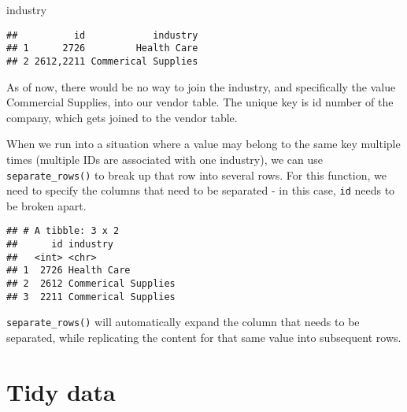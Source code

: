 \documentclass[
]{book}
\newenvironment{Shaded}{\begin{snugshade}}{\end{snugshade}}
\newcommand{\CommentTok}[1]{\textcolor[rgb]{0.56,0.35,0.01}{\textit{#1}}}
\newcommand{\DataTypeTok}[1]{\textcolor[rgb]{0.13,0.29,0.53}{#1}}
\newcommand{\KeywordTok}[1]{\textcolor[rgb]{0.13,0.29,0.53}{\textbf{#1}}}
\newcommand{\NormalTok}[1]{#1}
\newcommand{\OperatorTok}[1]{\textcolor[rgb]{0.81,0.36,0.00}{\textbf{#1}}}
\newcommand{\OtherTok}[1]{\textcolor[rgb]{0.56,0.35,0.01}{#1}}
\newcommand{\StringTok}[1]{\textcolor[rgb]{0.31,0.60,0.02}{#1}}
\begin{document}
\begin{Shaded}
\begin{Highlighting}[]
\NormalTok{industry}
\end{Highlighting}
\end{Shaded}

\begin{verbatim}
##          id            industry
## 1      2726         Health Care
## 2 2612,2211 Commerical Supplies
\end{verbatim}

As of now, there would be no way to join the industry, and specifically the value Commercial Supplies, into our vendor table. The unique key is id number of the company, which gets joined to the vendor table.

When we run into a situation where a value may belong to the same key multiple times (multiple IDs are associated with one industry), we can use \texttt{separate\_rows()} to break up that row into several rows. For this function, we need to specify the columns that need to be separated - in this case, \texttt{id} needs to be broken apart.

\begin{Shaded}
\end{Shaded}

\begin{verbatim}
## # A tibble: 3 x 2
##      id industry           
##   <int> <chr>              
## 1  2726 Health Care        
## 2  2612 Commerical Supplies
## 3  2211 Commerical Supplies
\end{verbatim}

\texttt{separate\_rows()} will automatically expand the column that needs to be separated, while replicating the content for that same value into subsequent rows.

\hypertarget{tidy-data}{%
\section{Tidy data}\label{tidy-data}}
\end{document}
